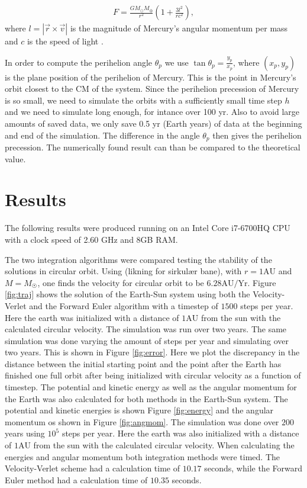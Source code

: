 \documentclass[twocolumn]{aastex62}
\begin{document}
\begin{align}\label{eq:relcorrection}
    F = \frac{G M_\odot M_\oplus}{r^2}\left(1 + \frac{3l^2}{r c^2}\right),
\end{align}
where $l = |\vec{r}\times \vec{v}|$ is the magnitude of Mercury's angular
momentum per mass and $c$ is the speed of light \cite{jensen:2019}.

In order to compute the perihelion angle $\theta_p$ we use $\tan \theta_p =
\frac{y_p}{x_p}$, where $(x_p, y_p)$ is the plane position of the perihelion of
Mercury. This is the point in Mercury's orbit closest to the CM of the system.
Since the perihelion precession of Mercury is so small, we need to simulate the
orbits with a sufficiently small time step $h$ and we need to simulate long
enough, for intance over 100 yr. Also to avoid large amounts of
saved data, we only save 0.5 yr (Earth years) of data at the beginning and end of the
simulation. The difference in the angle $\theta_p$ then gives the perihelion
precession. The numerically found result can than be compared to the theoretical
value.

\section{Results} \label{sec:results}
The following results were produced running on an Intel Core i7-6700HQ CPU with
a clock speed of 2.60 GHz and 8GB RAM.

The two integration algorithms were compared testing the stability of the
solutions in circular orbit. Using (likning for sirkulær bane), with
$r=1\mathrm{AU}$ and $M=M_{\astrosun}$, one finds the velocity for circular
orbit to be $6.28\mathrm{AU/Yr}$. Figure \ref{fig:traj} shows the solution of
the Earth-Sun system using both the Velocity-Verlet and the Forward Euler
algorithm with a timestep of $1500$ steps per year. Here the earth was
initialized with a distance of $1\mathrm{AU}$ from the sun with the calculated
circular velocity. The simulation was run over two years. The same simulation
was done varying the amount of steps per year and simulating over two years.
This is shown in Figure \ref{fig:error}. Here we plot the discrepancy in the
distance between the initial starting point and the point after the Earth has
finished one full orbit after being initialized with circular velocity as a
function of timestep. The potential and kinetic energy as well as the angular
momentum for the Earth was also calculated for both methods in the Earth-Sun system. The
potential and kinetic energies is shown Figure \ref{fig:energy} and the angular
momentum os shown in Figure \ref{fig:angmom}. The simulation was done over $200$
years using $10^5$ steps per year. Here the earth was also initialized with a
distance of $1\mathrm{AU}$ from the sun with the calculated circular velocity.
When calculating the energies and angular momentum both integration methods were
timed. The Velocity-Verlet scheme had a calculation time of $10.17$ seconds, while the
Forward Euler method had a calculation time of $10.35$ seconds.
\end{document}
